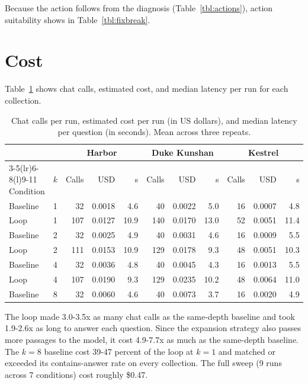 \documentclass[12pt, a4paper, oneside]{report}
\begin{document}
Because the action follows from the diagnosis (Table~\ref{tbl:actions}),
action suitability shows in Table~\ref{tbl:fixbreak}.

\section{Cost}

Table~\ref{tbl:cost} shows chat calls, estimated cost, and median latency
per run for each collection.

\begin{table}[htbp]
\centering
\footnotesize
\setlength{\tabcolsep}{4pt}
\begin{tabular}{@{}llrrrrrrrrr@{}}
\toprule
 & & \multicolumn{3}{c}{Harbor} & \multicolumn{3}{c}{Duke Kunshan} & \multicolumn{3}{c}{Kestrel} \\
\cmidrule(lr){3-5}\cmidrule(lr){6-8}\cmidrule(l){9-11}
Condition & $k$ & Calls & USD & s & Calls & USD & s & Calls & USD & s \\
\midrule
Baseline & 1 & 32 & 0.0018 & 4.6 & 40 & 0.0022 & 5.0 & 16 & 0.0007 & 4.8 \\
Loop     & 1 & 107 & 0.0127 & 10.9 & 140 & 0.0170 & 13.0 & 52 & 0.0051 & 11.4 \\
Baseline & 2 & 32 & 0.0025 & 4.9 & 40 & 0.0031 & 4.6 & 16 & 0.0009 & 5.5 \\
Loop     & 2 & 111 & 0.0153 & 10.9 & 129 & 0.0178 & 9.3 & 48 & 0.0051 & 10.3 \\
Baseline & 4 & 32 & 0.0036 & 4.8 & 40 & 0.0045 & 4.3 & 16 & 0.0013 & 5.5 \\
Loop     & 4 & 107 & 0.0190 & 9.3 & 129 & 0.0235 & 10.2 & 48 & 0.0064 & 11.0 \\
Baseline & 8 & 32 & 0.0060 & 4.6 & 40 & 0.0073 & 3.7 & 16 & 0.0020 & 4.9 \\
\bottomrule
\end{tabular}
\caption{Chat calls per run, estimated cost per run (in US dollars), and
median latency per question (in seconds). Mean across three repeats.}
\label{tbl:cost}
\end{table}

The loop made 3.0-3.5x as many chat calls as the same-depth baseline and
took 1.9-2.6x as long to answer each question. Since the expansion strategy
also passes more passages to the model, it cost 4.9-7.7x as much as the
same-depth baseline. The $k=8$ baseline cost 39-47 percent of the loop at $k=1$ and
matched or exceeded its contains-answer rate on every collection. The full
sweep (9 runs across 7 conditions) cost roughly \$0.47.
\end{document}

